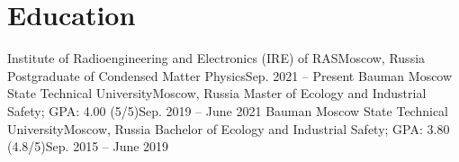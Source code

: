 

\section{Education}\label{sec:education}
\resumeSubHeadingListStart
\resumeSubheading
{Institute of Radioengineering and Electronics (IRE) of RAS}{Moscow, Russia}
{Postgraduate of Condensed Matter Physics}{Sep. 2021 -- Present}
\resumeSubheading
{Bauman Moscow State Technical University}{Moscow, Russia}
{Master of Ecology and Industrial Safety; GPA: 4.00 (5/5)}{Sep. 2019 -- June 2021}
\resumeSubheading
{Bauman Moscow State Technical University}{Moscow, Russia}
{Bachelor of Ecology and Industrial Safety; GPA: 3.80 (4.8/5)}{Sep. 2015 -- June 2019}
\resumeSubHeadingListEnd